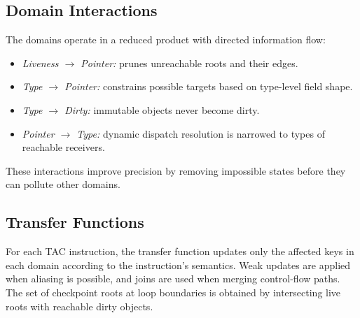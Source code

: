 

\subsection{Domain Interactions}
The domains operate in a reduced product with directed information flow:
\begin{itemize}
    \item \emph{Liveness $\rightarrow$ Pointer:} prunes unreachable roots and their edges.
    \item \emph{Type $\rightarrow$ Pointer:} constrains possible targets based on type-level field shape.
    \item \emph{Type $\rightarrow$ Dirty:} immutable objects never become dirty.
    \item \emph{Pointer $\rightarrow$ Type:} dynamic dispatch resolution is narrowed to types of reachable receivers.
\end{itemize}
These interactions improve precision by removing impossible states before they can pollute other domains.

\subsection{Transfer Functions}
For each TAC instruction, the transfer function updates only the affected keys in each domain according to the instruction’s semantics.
Weak updates are applied when aliasing is possible, and joins are used when merging control-flow paths.
The set of checkpoint roots at loop boundaries is obtained by intersecting live roots with reachable dirty objects.


